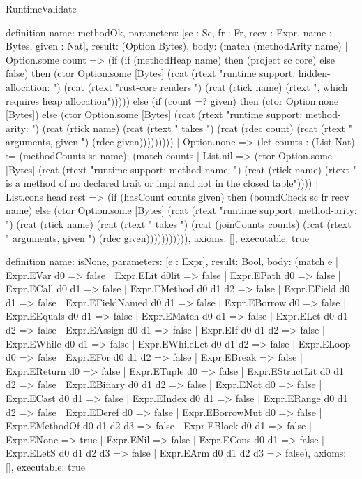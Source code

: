 \begin{lexlean}{RuntimeValidate}
\begin{semanticmodule}
definition{
  name: methodOk,
  parameters: [sc : Sc, fr : Fr, recv : Expr, name : Bytes, given : Nat],
  result: (Option Bytes),
  body: (match (methodArity name)
    | Option.some count => (if (if (methodHeap name) then (project sc core) else false) then (ctor Option.some [Bytes] (rcat (rtext "runtime support: hidden-allocation: ") (rcat (rtext "rust-core renders ") (rcat (rtick name) (rtext ", which requires heap allocation"))))) else (if (count =? given) then (ctor Option.none [Bytes]) else (ctor Option.some [Bytes] (rcat (rtext "runtime support: method-arity: ") (rcat (rtick name) (rcat (rtext " takes ") (rcat (rdec count) (rcat (rtext " arguments, given ") (rdec given)))))))))
    | Option.none => (let counts : (List Nat) := (methodCounts sc name); (match counts
      | List.nil => (ctor Option.some [Bytes] (rcat (rtext "runtime support: method-name: ") (rcat (rtick name) (rtext " is a method of no declared trait or impl and not in the closed table"))))
      | List.cons head rest => (if (hasCount counts given) then (boundCheck sc fr recv name) else (ctor Option.some [Bytes] (rcat (rtext "runtime support: method-arity: ") (rcat (rtick name) (rcat (rtext " takes ") (rcat (joinCounts counts) (rcat (rtext " arguments, given ") (rdec given))))))))))),
  axioms: [],
  executable: true
}

definition{
  name: isNone,
  parameters: [e : Expr],
  result: Bool,
  body: (match e
    | Expr.EVar d0 => false
    | Expr.ELit d0lit => false
    | Expr.EPath d0 => false
    | Expr.ECall d0 d1 => false
    | Expr.EMethod d0 d1 d2 => false
    | Expr.EField d0 d1 => false
    | Expr.EFieldNamed d0 d1 => false
    | Expr.EBorrow d0 => false
    | Expr.EEquals d0 d1 => false
    | Expr.EMatch d0 d1 => false
    | Expr.ELet d0 d1 d2 => false
    | Expr.EAssign d0 d1 => false
    | Expr.EIf d0 d1 d2 => false
    | Expr.EWhile d0 d1 => false
    | Expr.EWhileLet d0 d1 d2 => false
    | Expr.ELoop d0 => false
    | Expr.EFor d0 d1 d2 => false
    | Expr.EBreak => false
    | Expr.EReturn d0 => false
    | Expr.ETuple d0 => false
    | Expr.EStructLit d0 d1 d2 => false
    | Expr.EBinary d0 d1 d2 => false
    | Expr.ENot d0 => false
    | Expr.ECast d0 d1 => false
    | Expr.EIndex d0 d1 => false
    | Expr.ERange d0 d1 d2 => false
    | Expr.EDeref d0 => false
    | Expr.EBorrowMut d0 => false
    | Expr.EMethodOf d0 d1 d2 d3 => false
    | Expr.EBlock d0 d1 => false
    | Expr.ENone => true
    | Expr.ENil => false
    | Expr.ECons d0 d1 => false
    | Expr.ELetS d0 d1 d2 d3 => false
    | Expr.EArm d0 d1 d2 d3 => false),
  axioms: [],
  executable: true
}


\end{semanticmodule}
\end{lexlean}
